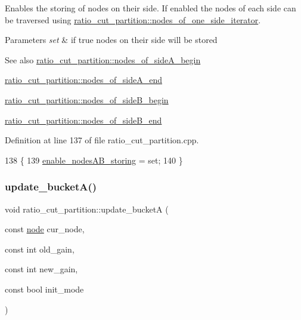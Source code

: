 Enables the storing of nodes on their side. If enabled the nodes of each side can be traversed using \mbox{\hyperlink{classratio__cut__partition_af438a591f6559b479bf40e9ac9cfcf0e}{ratio\+\_\+cut\+\_\+partition\+::nodes\+\_\+of\+\_\+one\+\_\+side\+\_\+iterator}}.


\begin{DoxyParams}{Parameters}
{\em set} & if {\ttfamily true} nodes on their side will be stored \\
\hline
\end{DoxyParams}
\begin{DoxySeeAlso}{See also}
\mbox{\hyperlink{classratio__cut__partition_a0c569bb7bd0a94269bd8938a2e0fce85}{ratio\+\_\+cut\+\_\+partition\+::nodes\+\_\+of\+\_\+side\+A\+\_\+begin}} 

\mbox{\hyperlink{classratio__cut__partition_a497d63a55cf326f62b97d0c77be094c7}{ratio\+\_\+cut\+\_\+partition\+::nodes\+\_\+of\+\_\+side\+A\+\_\+end}} 

\mbox{\hyperlink{classratio__cut__partition_ae36c08387ff6eae1236076cdbabf4fa5}{ratio\+\_\+cut\+\_\+partition\+::nodes\+\_\+of\+\_\+side\+B\+\_\+begin}} 

\mbox{\hyperlink{classratio__cut__partition_a838e3ab6d00155c1f3868cc920a4a8f6}{ratio\+\_\+cut\+\_\+partition\+::nodes\+\_\+of\+\_\+side\+B\+\_\+end}} 
\end{DoxySeeAlso}


Definition at line 137 of file ratio\+\_\+cut\+\_\+partition.\+cpp.


\begin{DoxyCode}
138 \{
139     \mbox{\hyperlink{classratio__cut__partition_a6dff7e2e6cecdc63147fdee71d876a34}{enable\_nodesAB\_storing}} = \textcolor{keyword}{set};
140 \}
\end{DoxyCode}
\mbox{\label{classratio__cut__partition_acbd0608a7e5560a52c447711cb59a644}} 
\subsubsection{\texorpdfstring{update\+\_\+bucket\+A()}{update\_bucketA()}}
{\footnotesize\ttfamily void ratio\+\_\+cut\+\_\+partition\+::update\+\_\+bucketA (\begin{DoxyParamCaption}\item[{const \mbox{\hyperlink{classnode}{node}}}]{cur\+\_\+node,  }\item[{const int}]{old\+\_\+gain,  }\item[{const int}]{new\+\_\+gain,  }\item[{const bool}]{init\+\_\+mode }\end{DoxyParamCaption})\hspace{0.3cm}{\ttfamily [protected]}}



